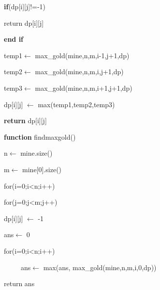 \documentclass[10pt]{report}
\begin{document}
\begin{multicols}{2}
\textbf{if}(dp[i][j]!=-1)\par

\tab return dp[i][j]\par

\textbf{end if}\par


\vspace{\baselineskip}
temp1$ \leftarrow $ max\_gold(mine,n,m,i-1,j+1,dp)\par

temp2$ \leftarrow $ max\_gold(mine,n,m,i,j+1,dp)\par

temp3$ \leftarrow $ max\_gold(mine,n,m,i+1,j+1,dp)\par

dp[i][j] $ \leftarrow $  max(temp1,temp2,temp3)\par


\vspace{\baselineskip}
\textbf{return} dp[i][j]\par


\vspace{\baselineskip}
\textbf{function }findmaxgold()\par

n$ \leftarrow $ mine.size()\par

m$ \leftarrow $ mine[0].size()\par


\vspace{\baselineskip}

\vspace{\baselineskip}
for(i=0;i<n;i++)\par

\tab for(j=0;j<m;j++)\par

\tab \tab dp[i][j] $ \leftarrow $ -1\par


\vspace{\baselineskip}
ans$ \leftarrow $ 0\par

for(i=0;i<n;i++)\par

\ \ \ \ \  ans$ \leftarrow $ max(ans, max\_gold(mine,n,m,i,0,dp))\par


\vspace{\baselineskip}
return ans\par


\vspace{\baselineskip}


\end{multicols}
\end{document}
